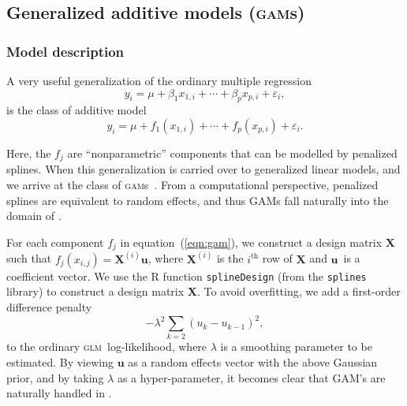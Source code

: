 \documentclass{admbmanual}
\newcommand{\scGAM}{\textsc{gam}}
\newcommand{\scGLM}{\textsc{glm}}
\begin{document}

\subsection{Generalized additive models (\scGAM{}s)}
\label{sec:gam}

\subsubsection{Model description}

A very useful generalization of the ordinary multiple regression
\[
y_i=\mu +\beta_1x_{1,i}+\cdots +\beta_px_{p,i}+\varepsilon_i,
\]%
is the class of additive model
\begin{equation}
  y_i=\mu+f_1(x_{1,i})+\cdots +f_p(x_{p,i})+\varepsilon_i.
  \label{eqn:gam}
\end{equation}%

Here, the $f_j$ are ``nonparametric'' components that can be modelled by
penalized splines. When this generalization is carried over to generalized
linear models, and we arrive at the class of \scGAM{}s~\cite{hast:tibs:1990}.
From a computational perspective, penalized splines are equivalent to random
effects, and thus GAMs fall naturally into the domain of \scAR.

For each component $f_j$ in equation~(\ref{eqn:gam}), we construct a design
matrix $\mathbf{X}$ such that $f_j(x_{i,j})=\mathbf{X}^{(i)}\mathbf{u}$, where
$\mathbf{X}^{(i)}$ is the $i^{\textrm{th}}$ row of $\mathbf{X}$ and
$\mathbf{u}$\ is a coefficient vector. We use the R function
\texttt{splineDesign} (from the \texttt{splines} library) to construct a design
matrix $\mathbf{X}$. To avoid overfitting, we add a first-order difference
penalty~\cite{eile:marx:1996}
\begin{equation}
  -\lambda^2\sum_{k=2}\left(u_k-u_{k-1}\right)^2,
  \label{eqn:first_order}
\end{equation}
to the ordinary \scGLM\ log-likelihood, where $\lambda $ is a smoothing
parameter to be estimated. By viewing $\mathbf{u}$ as a random effects vector
with the above Gaussian prior, and by taking $\lambda $ as a hyper-parameter, it
becomes clear that GAM's are naturally handled in \scAR.
\end{document}
